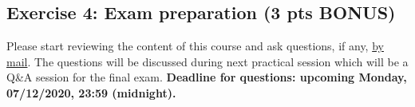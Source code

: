 \documentclass [11pt, a4wide, twoside]{article}
\begin{document}
\subsection*{Exercise 4: Exam preparation (3 pts BONUS)}
Please start reviewing the content of this course and ask questions, if any, \underline{by mail}. The questions will be discussed during next practical session which will be a Q\&A session for the final exam. \textbf{Deadline for questions: upcoming Monday, 07/12/2020, 23:59 (midnight).}
\end{document}
